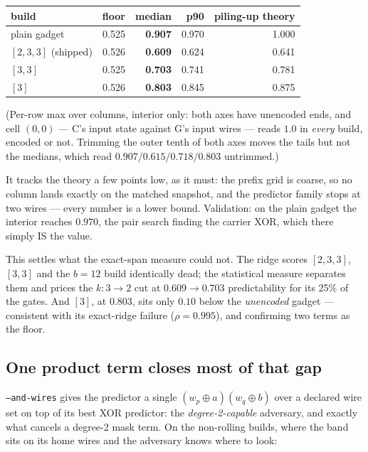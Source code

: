 \documentclass[11pt]{article}
\newcommand{\xor}{\oplus}
\begin{document}
\begin{center}
\begin{tabular}{lrrrr}
\toprule
build & floor & median & p90 & piling-up theory \\
\midrule
plain gadget & 0.525 & \textbf{0.907} & 0.970 & 1.000 \\
$[2,3,3]$ (shipped) & 0.526 & \textbf{0.609} & 0.624 & 0.641 \\
$[3,3]$ & 0.525 & \textbf{0.703} & 0.741 & 0.781 \\
$[3]$ & 0.526 & \textbf{0.803} & 0.845 & 0.875 \\
\bottomrule
\end{tabular}
\end{center}

\noindent (Per-row max over columns, interior only: both axes have unencoded
ends, and cell $(0,0)$ --- C's input state against G's input wires --- reads
$1.0$ in \emph{every} build, encoded or not. Trimming the outer tenth of both
axes moves the tails but not the medians, which read $0.907 / 0.615 / 0.718 /
0.803$ untrimmed.)

It tracks the theory a few points low, as it must: the prefix grid is coarse, so
no column lands exactly on the matched snapshot, and the predictor family stops
at two wires --- every number is a lower bound. Validation: on the plain gadget
the interior reaches $0.970$, the pair search finding the carrier XOR, which
there simply IS the value.

This settles what the exact-span measure could not. The ridge scores $[2,3,3]$,
$[3,3]$ and the $b{=}12$ build identically dead; the statistical measure
separates them and prices the $k{:}3\to2$ cut at $0.609 \to 0.703$
predictability for its 25\% of the gates. And $[3]$, at $0.803$, sits only
$0.10$ below the \emph{unencoded} gadget --- consistent with its exact-ridge
failure ($\rho = 0.995$), and confirming two terms as the floor.

\subsection{One product term closes most of that gap}

\texttt{--and-wires} gives the predictor a single
$(w_p \xor a)(w_q \xor b)$ over a declared wire set on top of its best XOR
predictor: the \emph{degree-2-capable} adversary, and exactly what cancels a
degree-2 mask term. On the non-rolling builds, where the band sits on its home
wires and the adversary knows where to look:
\end{document}
